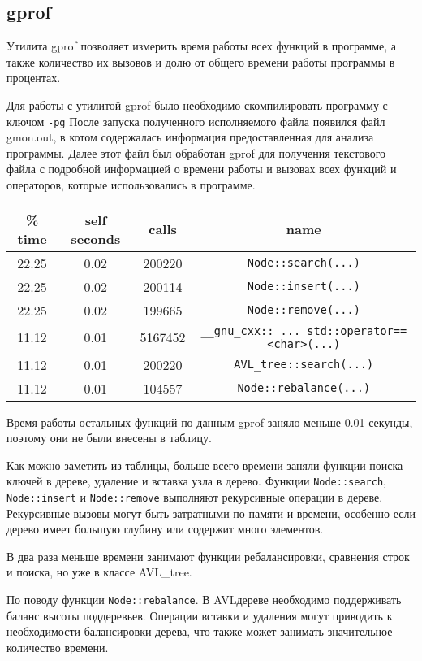 \documentclass[12pt]{article}
\begin{document}
\subsection*{gprof}

Утилита gprof позволяет измерить время работы всех функций в программе, 
а также количество их вызовов и долю от общего времени работы программы в процентах.

Для работы с утилитой gprof было необходимо скомпилировать программу с ключом \texttt{-pg}
После запуска полученного исполняемого файла появился файл gmon.out, в котом содержалась информация
предоставленная для анализа программы. Далее этот файл был обработан gprof для получения текстового
файла с подробной информацией о времени работы и вызовах всех функций и операторов,
которые использовались в программе.

\begin{tabular}{ | c | c | c | c | }
    \hline
        \% time & self seconds & calls & name \\
        \hline 
        22.25 & 0.02 & 200220 & \texttt{Node::search(...)} \\
        22.25 & 0.02 & 200114 & \texttt{Node::insert(...)} \\
        22.25 & 0.02 & 199665 & \texttt{Node::remove(...)} \\
        11.12 & 0.01 & 5167452 & \texttt{\_\_gnu\_cxx:: ... std::operator==<char>(...)}\\
        11.12 & 0.01 & 200220 & \texttt{AVL\_tree::search(...)} \\
        11.12 & 0.01 & 104557 & \texttt{Node::rebalance(...)} \\
        \hline
\end{tabular}

Время работы остальных функций по данным gprof заняло меньше 0.01 секунды, поэтому они не были внесены в таблицу.

Как можно заметить из таблицы, больше всего времени заняли функции поиска ключей в дереве, удаление и вставка узла в дерево.
Функции \texttt{Node::search}, \texttt{Node::insert} и \texttt{Node::remove} выполняют рекурсивные операции в дереве. 
Рекурсивные вызовы могут быть затратными по памяти и времени, особенно если дерево имеет большую глубину или содержит много элементов.

В два раза меньше времени занимают функции ребалансировки, сравнения строк и поиска, но уже в классе AVL\_tree.

По поводу функции \texttt{Node::rebalance}. В AVL\-дереве необходимо поддерживать баланс высоты поддеревьев. 
Операции вставки и удаления могут приводить к необходимости балансировки дерева, что также может занимать значительное количество времени.
\end{document}
